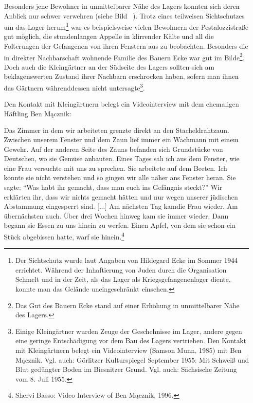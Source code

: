 \documentclass[a4paper,12pt,ngerman,
]{nisebook}
\begin{document}
Besonders jene Bewohner in unmittelbarer Nähe des Lagers konnten sich deren Anblick nur schwer verwehren (siehe Bild ~). Trotz eines teilweisen Sichtschutzes um das Lager herum\footnote{Der Sichtschutz wurde laut Angaben von Hildegard Ecke im Sommer 1944 errichtet. Während der Inhaftierung von Juden durch die Organisation Schmelt und in der Zeit, als das Lager als Kriegsgefangenenlager diente, konnte man das Gelände uneingeschränkt einsehen.} war es beispielsweise vielen Bewohnern der Pestalozzistraße gut möglich, die stundenlangen Appelle in klirrender Kälte und all die Folterungen der Gefangenen von ihren Fenstern aus zu beobachten. Besonders die in direkter Nachbarschaft wohnende Familie des Bauern Ecke war gut im Bilde\footnote{Das Gut des Bauern Ecke stand auf einer Erhöhung in unmittelbarer Nähe des Lagers.}. Doch auch die Kleingärtner an der Südseite des Lagers sollten sich am beklagenswerten Zustand ihrer Nachbarn erschrocken haben, sofern man ihnen das Gärtnern währenddessen nicht untersagte\footnote{Einige Kleingärtner wurden Zeuge der Geschehnisse im Lager, andere gegen eine geringe Entschädigung vor dem Bau des Lagers vertrieben. Den Kontakt mit Kleingärtnern belegt ein Videointerview (Samson Munn, 1985) mit Ben Mącznik. Vgl. auch: Görlitzer Kulturspiegel September 1955: Mit Schweiß und Blut gedüngter Boden im Biesnitzer Grund. Vgl. auch: Sächsische Zeitung vom 8. Juli 1955.}.

Den Kontakt mit Kleingärtnern belegt ein Videointerview mit dem ehemaligen Häftling Ben Mącznik:
\begin{leftbar}
Das Zimmer in dem wir arbeiteten grenzte direkt an den Stacheldrahtzaun. Zwischen unserem Fenster und dem Zaun lief immer ein Wachmann mit einem Gewehr. Auf der anderen Seite des Zauns befanden sich Grundstücke von Deutschen, wo sie Gemüse anbauten.
Eines Tages sah ich aus dem Fenster, wie eine Frau versuchte mit uns zu sprechen. Sie arbeitete auf dem Beeten. Ich konnte sie nicht verstehen
und so gingen wir alle näher ans Fenster heran. Sie sagte: {}``Was habt ihr gemacht, dass man euch ins Gefängnis steckt?'' Wir erklärten ihr, dass wir nichts gemacht hätten und nur wegen unserer jüdischen Abstammung eingesperrt sind. {[}...{]} Am nächsten Tag kam\linebreak\newpage die Frau
wieder. Am übernächsten auch. Über drei Wochen hinweg kam sie immer wieder. Dann begann sie Essen zu uns hinein zu werfen. Einen Apfel, von dem sie schon ein Stück abgebissen hatte, warf sie hinein.\footnote{Shervi Basso: Video Interview of Ben Mącznik, 1996.}
\end{leftbar}
\end{document}
